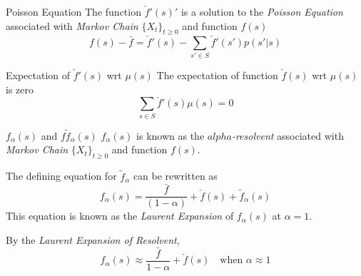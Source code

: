 \documentclass[11pt,a4paper]{article}
\begin{document}
  \begin{remark}{Poisson Equation}
    The function $\check{f}'(s)'$ is a solution to the \textit{Poisson Equation} associated with \textit{Markov Chain} $\{X_t\}_{t\geq0}$ and function $f(s)$
    \[ f(s)-\bar{f}=\check{f}'(s)-\sum_{s'\in S}\check{f}'(s')p(s'|s) \]
  \end{remark}

  \begin{remark}{Expectation of $\check{f}'(s)$ wrt $\mu(s)$}
    The expectation of function $\check{f}(s)$ wrt $\mu(s)$ is zero
    \[ \sum_{s\in S}\check{f}'(s)\mu(s)=0 \]
  \end{remark}

  \begin{remark}{$f_\alpha(s)$ and $f\tilde{f}_\alpha(s)$}
    $f_\alpha(s)$ is known as the \textit{$alpha$-resolvent} associated with \textit{Markov Chain} $\{X_t\}_{t\geq0}$ and function $f(s)$.
    \par The defining equation for $\tilde{f}_\alpha$ can be rewritten as
    \[ f_\alpha(s)=\frac{\bar{f}}{(1-\alpha)}+\check{f}(s)+\tilde{f}_\alpha(s) \]
    This equation is known as the \textit{Laurent Expansion} of $f_\alpha(s)$ at $\alpha=1$.
    \par By the \textit{Laurent Expansion of Resolvent},
    \[ f_\alpha(s)\approx\frac{\bar{f}}{1-\alpha}+\check{f}(s)\quad\text{when }\alpha\approx1 \]
  \end{remark}
\end{document}
